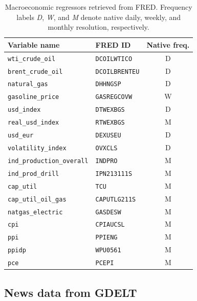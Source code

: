 \documentclass[11pt,a4paper]{article}
\begin{document}
\begin{table}[h!]
\centering
\caption{Macroeconomic regressors retrieved from FRED. Frequency labels \emph{D}, \emph{W}, and \emph{M} denote native daily, weekly, and monthly resolution, respectively.}\label{tab:fred-series}
\small
\begin{tabular}{@{}llc@{}}
\toprule
Variable name & FRED ID & Native freq.\\
\midrule
\texttt{wti\_crude\_oil}        & \texttt{DCOILWTICO}   & D \\
\texttt{brent\_crude\_oil}      & \texttt{DCOILBRENTEU} & D \\
\texttt{natural\_gas}           & \texttt{DHHNGSP}      & D \\
\texttt{gasoline\_price}        & \texttt{GASREGCOVW}   & W \\
\texttt{usd\_index}             & \texttt{DTWEXBGS}     & D \\
\texttt{real\_usd\_index}       & \texttt{RTWEXBGS}     & M \\
\texttt{usd\_eur}               & \texttt{DEXUSEU}      & D \\
\texttt{volatility\_index}      & \texttt{OVXCLS}       & D \\
\texttt{ind\_production\_overall} & \texttt{INDPRO}     & M \\
\texttt{ind\_prod\_drill}       & \texttt{IPN213111S}   & M \\
\texttt{cap\_util}              & \texttt{TCU}          & M \\
\texttt{cap\_util\_oil\_gas}    & \texttt{CAPUTLG211S}  & M \\
\texttt{natgas\_electric}       & \texttt{GASDESW}      & M \\
\texttt{cpi}                    & \texttt{CPIAUCSL}     & M \\
\texttt{ppi}                    & \texttt{PPIENG}       & M \\
\texttt{ppidp}                  & \texttt{WPU0561}      & M \\
\texttt{pce}                    & \texttt{PCEPI}        & M \\
\bottomrule
\end{tabular}
\end{table}

\subsection{News data from GDELT}\label{sec:news-prep}
\end{document}

